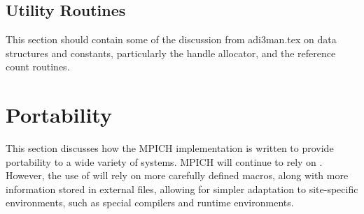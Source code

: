 \documentclass{article}
\begin{document}


\subsection{Utility Routines}
This section should contain some of the discussion from adi3man.tex on data
structures and constants, particularly the handle allocator, and the reference
count routines.  

\section{Portability}
\label{sec:portability}

This section discusses how the MPICH implementation is written to
provide portability to a wide variety of systems.  MPICH will continue
to rely on .  However, the use of 
will rely on more carefully defined macros, along with more
information stored in external files, allowing for simpler adaptation
to site-specific environments, such as special compilers and runtime
environments. 
\end{document}
